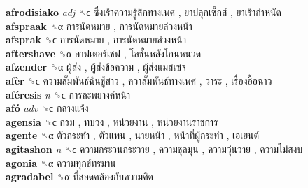\textbf{afrodisiako} \emph{adj}  ␝ϲ   ซึ่งเร้าความรู้สึกทางเพศ ,  ยาปลุกเซ็กส์ ,  ยาเร้ากำหนัด   \\
\textbf{afspraak} ␝α   การนัดหมาย ,  การนัดหมายล่วงหน้า   \\
\textbf{afsprak} ␝ϲ   การนัดหมาย ,  การนัดหมายล่วงหน้า   \\
\textbf{aftershave} ␝α   อาฟเตอร์เชฟ ,  โลชั่นหลังโกนหนวด   \\
\textbf{afzender} ␝α   ผู้ส่ง ,  ผู้ส่งข้อความ ,  ผู้ส่งแมสเซจ   \\
\textbf{afèr} ␝ϲ   ความสัมพันธ์ฉันชู้สาว ,  ควาสัมพันธ์ทางเพศ ,  วาระ ,  เรื่องอื้อฉาว   \\
\textbf{aféresis} \emph{n}  ␝ϲ   การละพยางค์หน้า   \\
\textbf{afó} \emph{adv}  ␝ϲ   กลางแจ้ง   \\
\textbf{agensia} ␝ϲ   กรม ,  ทบวง ,  หน่วยงาน ,  หน่วยงานราชการ   \\
\textbf{agente} ␝α   ตัวกระทำ ,  ตัวแทน ,  นายหน้า ,  หน้าที่ผู้กระทำ ,  เอเยนต์   \\
\textbf{agitashon} \emph{n}  ␝ϲ   ความกระวนกระวาย ,  ความชุลมุน ,  ความวุ่นวาย ,  ความไม่สงบ   \\
\textbf{agonia} ␝α   ความทุกข์ทรมาน   \\
\textbf{agradabel} ␝α   ที่สอดคล้องกับความคิด   \\
